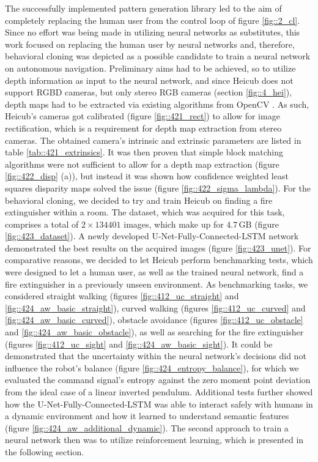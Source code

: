 The successfully implemented pattern generation library led to the aim of completely replacing the human user from the control loop of figure \ref{fig::2_cl}. Since no effort was being made in utilizing neural networks as substitutes, this work focused on replacing the human user by neural networks and, therefore, behavioral cloning was depicted as a possible candidate to train a neural network on autonomous navigation. Preliminary aims had to be achieved, so to utilize depth information as input to the neural network, and since Heicub does not support RGBD cameras, but only stereo RGB cameras (section \ref{fig::4_hei}), depth maps had to be extracted via existing algorithms from OpenCV \cite{opencv_library}. As such, Heicub's cameras got calibrated (figure \ref{fig::421_rect}) to allow for image rectification, which is a requirement for depth map extraction from stereo cameras. The obtained camera's intrinsic and extrinsic parameters are listed in table \ref{tab::421_extrinsics}. It was then proven that simple block matching algorithms were not sufficient to allow for a depth map extraction (figure \ref{fig::422_disp} (a)), but instead it was shown how confidence weighted least squares disparity maps solved the issue (figure \ref{fig::422_sigma_lambda}). For the behavioral cloning, we decided to try and train Heicub on finding a fire extinguisher within a room. The dataset, which was acquired for this task, comprises a total of $2\times134401$ images, which make up for $4.7\,\text{GB}$ (figure \ref{fig::423_dataset}). A newly developed U-Net-Fully-Connected-LSTM network demonstrated the best results on the acquired images (figure \ref{fig::423_unet}). For comparative reasons, we decided to let Heicub perform benchmarking tests, which were designed to let a human user, as well as the trained neural network, find a fire extinguisher in a previously unseen environment. As benchmarking tasks, we considered straight walking (figures \ref{fig::412_uc_straight} and \ref{fig::424_aw_basic_straight}), curved walking (figures \ref{fig::412_uc_curved} and \ref{fig::424_aw_basic_curved}), obstacle avoidance (figures \ref{fig::412_uc_obstacle} and \ref{fig::424_aw_basic_obstacle}), as well as searching for the fire extinguisher (figures \ref{fig::412_uc_sight} and \ref{fig::424_aw_basic_sight}). It could be demonstrated that the uncertainty within the neural network's decisions did not influence the robot's balance (figure \ref{fig::424_entropy_balance}), for which we evaluated the command signal's entropy against the zero moment point deviation from the ideal case of a linear inverted pendulum. Additional tests further showed how the U-Net-Fully-Connected-LSTM was able to interact safely with humans in a dynamic environment and how it learned to understand semantic features (figure \ref{fig::424_aw_additional_dynamic}). The second approach to train a neural network then was to utilize reinforcement learning, which is presented in the following section.\\\\
